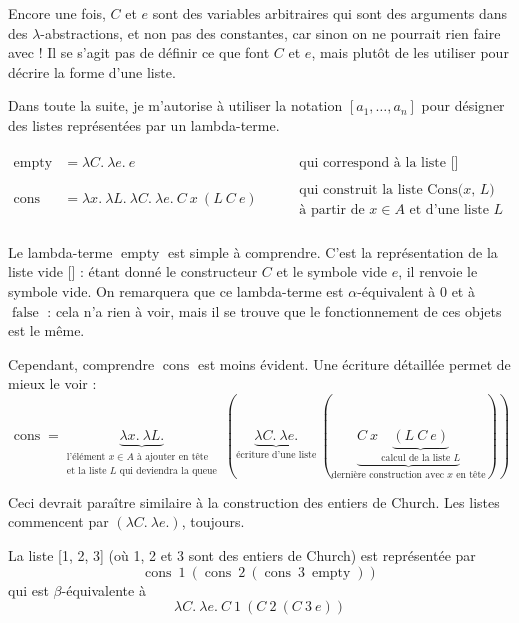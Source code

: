 \documentclass[11pt]{article}
\begin{document}
Encore une fois, $C$ et $e$ sont des variables arbitraires qui sont des arguments dans des $\lambda$-abstractions, et non pas des constantes, car sinon on ne pourrait rien faire avec ! Il se s'agit pas de définir ce que font $C$ et $e$, mais plutôt de les utiliser pour décrire la forme d'une liste.

Dans toute la suite, je m'autorise à utiliser la notation $\left[a_1, \dots, a_n\right]$ pour désigner des listes représentées par un lambda-terme.

\begin{definition}
    \begin{equation*}
    \begin{aligned}
        \operatorname{empty} &= \lambda C.~\lambda e.~e &\substack{\text{qui correspond à la liste []}}\\
        \operatorname{cons} &= \lambda x.~\lambda L.~ \lambda C.~\lambda e.~C~x~(L~C~e) ~~~~~~~~ &\substack{\text{qui construit la liste Cons($x$, $L$)}\\\text{à partir de $x\in A$ et d'une liste $L$}}\\
    \end{aligned}
    \end{equation*}
\end{definition}

Le lambda-terme $\operatorname{empty}$ est simple à comprendre. C'est la représentation de la liste vide [] : étant donné le constructeur $C$ et le symbole vide $e$, il renvoie le symbole vide. On remarquera que ce lambda-terme est $\alpha$-équivalent à $0$ et à $\operatorname{false}$ : cela n'a rien à voir, mais il se trouve que le fonctionnement de ces objets est le même.

Cependant, comprendre $\operatorname{cons}$ est moins évident. Une écriture détaillée permet de mieux le voir :
$$\operatorname{cons} = \underbrace{\lambda x.~\lambda L.}_{\substack{\text{l'élément $x \in A$ à ajouter en tête}\\\text{et la liste $L$ qui deviendra la queue}}}~\left(\underbrace{\lambda C.~\lambda e.}_\text{écriture d'une liste}~\left(\underbrace{C~x~\underbrace{\left(L~C~e\right)}_\text{calcul de la liste $L$}}_\text{dernière construction avec $x$ en tête}\right)\right)$$

Ceci devrait paraître similaire à la construction des entiers de Church. Les listes commencent par $(\lambda C.~\lambda e.)$, toujours.

\begin{example}
    La liste [1, 2, 3] (où 1, 2 et 3 sont des entiers de Church) est représentée par
    $$\operatorname{cons}~1~(\operatorname{cons}~2~(\operatorname{cons}~3~\operatorname{empty}))$$
    qui est $\beta$-équivalente à
    $$\lambda C.~\lambda e.~C~1~(C~2~(C~3~e))$$
\end{example}
\end{document}
